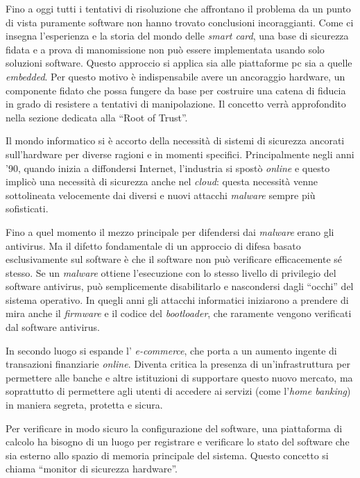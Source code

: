 Fino a oggi tutti i tentativi di risoluzione che affrontano il problema da un punto di vista puramente software non hanno trovato conclusioni incoraggianti. Come ci insegna l'esperienza e la storia del mondo delle \textit{smart card}, una base di sicurezza fidata e a prova di manomissione non può essere implementata usando solo soluzioni software. Questo approccio si applica sia alle piattaforme \acrshort{pc} sia a quelle \textit{embedded}. Per questo motivo è indispensabile avere un ancoraggio hardware, un componente fidato che possa fungere da base per costruire una catena di fiducia in grado di resistere a tentativi di manipolazione. Il concetto verrà approfondito nella sezione dedicata alla \enquote{Root of Trust}.

Il mondo informatico si è accorto della necessità di sistemi di sicurezza ancorati sull'hardware per diverse ragioni e in momenti specifici. Principalmente negli anni '90, quando inizia a diffondersi Internet, l'industria si spostò \textit{online} e questo implicò una necessità di sicurezza anche nel \textit{cloud}: questa necessità venne sottolineata velocemente dai diversi e nuovi attacchi \textit{malware} sempre più sofisticati.

Fino a quel momento il mezzo principale per difendersi dai \textit{malware} erano gli antivirus. Ma il difetto fondamentale di un approccio di difesa basato esclusivamente sul software è che il software non può verificare efficacemente sé stesso. Se un \textit{malware} ottiene l'esecuzione con lo stesso livello di privilegio del software antivirus, può semplicemente disabilitarlo e nascondersi dagli \enquote{occhi} del sistema operativo. In quegli anni gli attacchi informatici iniziarono a prendere di mira anche il \textit{firmware} e il codice del \textit{bootloader}, che raramente vengono verificati dal software antivirus. 

In secondo luogo si espande l' \textit{e-commerce}, che porta a un aumento ingente di transazioni finanziarie \textit{online}. Diventa critica la presenza di un'infrastruttura per permettere alle banche e altre istituzioni di supportare questo nuovo mercato, ma soprattutto di permettere agli utenti di accedere ai servizi (come l'\textit{home banking}) in maniera segreta, protetta e sicura.

Per verificare in modo sicuro la configurazione del software, una piattaforma di calcolo ha bisogno di un luogo per registrare e verificare lo stato del software che sia esterno allo spazio di memoria principale del sistema. Questo concetto si chiama \enquote{monitor di sicurezza hardware}.

